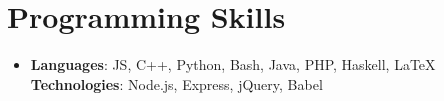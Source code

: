 \documentclass[letterpaper,11pt]{article}
\newcommand{\resumeSubHeadingListStart}{\begin{itemize}[leftmargin=*]}
\newcommand{\resumeSubHeadingListEnd}{\end{itemize}}
\begin{document}
\section{Programming Skills}
  \resumeSubHeadingListStart
    \item{
        \textbf{Languages}{: JS, C++, Python, Bash, Java, PHP, Haskell, LaTeX}
      \hfill
        \textbf{Technologies}{: Node.js, Express, jQuery, Babel}
    }
  \resumeSubHeadingListEnd


\end{document}
